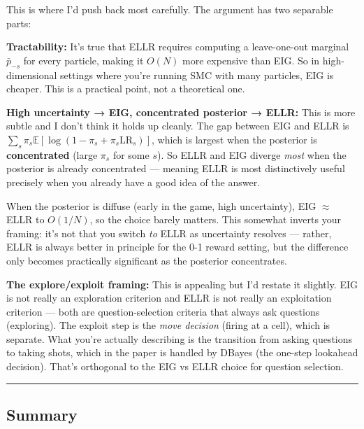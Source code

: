 \documentclass[
]{article}
\begin{document}
This is where I'd push back most carefully. The argument has two
separable parts:

\textbf{Tractability:} It's true that ELLR requires computing a
leave-one-out marginal \(\bar{p}_{-s}\) for every particle, making it
\(O(N)\) more expensive than EIG. So in high-dimensional settings where
you're running SMC with many particles, EIG is cheaper. This is a
practical point, not a theoretical one.

\textbf{High uncertainty → EIG, concentrated posterior → ELLR:} This is
more subtle and I don't think it holds up cleanly. The gap between EIG
and ELLR is
\(\sum_s \pi_s \mathbb{E}[\log(1 - \pi_s + \pi_s \mathrm{LR}_s)]\),
which is largest when the posterior is \textbf{concentrated} (large
\(\pi_s\) for some \(s\)). So ELLR and EIG diverge \emph{most} when the
posterior is already concentrated --- meaning ELLR is most distinctively
useful precisely when you already have a good idea of the answer.

When the posterior is diffuse (early in the game, high uncertainty), EIG
\(\approx\) ELLR to \(O(1/N)\), so the choice barely matters. This
somewhat inverts your framing: it's not that you switch \emph{to} ELLR
as uncertainty resolves --- rather, ELLR is always better in principle
for the 0-1 reward setting, but the difference only becomes practically
significant as the posterior concentrates.

\textbf{The explore/exploit framing:} This is appealing but I'd restate
it slightly. EIG is not really an exploration criterion and ELLR is not
really an exploitation criterion --- both are question-selection
criteria that always ask questions (exploring). The exploit step is the
\emph{move decision} (firing at a cell), which is separate. What you're
actually describing is the transition from asking questions to taking
shots, which in the paper is handled by DBayes (the one-step lookahead
decision). That's orthogonal to the EIG vs ELLR choice for question
selection.

\begin{center}\rule{0.5\linewidth}{0.5pt}\end{center}

\subsection{Summary}\label{summary}
\end{document}
